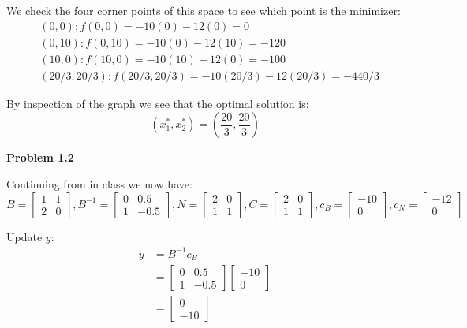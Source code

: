 \documentclass[12pt]{article}
\begin{document}
We check the four corner points of this space to see which point is the minimizer:
\begin{align*}
&(0,0): f(0,0) = -10(0)-12(0) = 0 \\
&(0,10): f(0, 10) = -10(0)-12(10) = -120\\
&(10,0): f(10, 0) = -10(10)-12(0) = -100\\
&(20/3, 20/3): f(20/3, 20/3) = -10(20/3)-12(20/3) = -440/3
\end{align*}

By inspection of the graph we see that the optimal solution is:
$$
(x_1^*, x_2^*) = \left(\frac{20}{3}, \frac{20}{3} \right)
$$

\noindent\textbf{Problem 1.2}

Continuing from in class we now have:
$$
B = \left[\begin{array}{cc} 1 & 1 \\ 2 & 0 \end{array}\right],
B^{-1} = \left[\begin{array}{cc} 0 & 0.5 \\ 1 & -0.5 \end{array}\right],
N = \left[\begin{array}{cc} 2 & 0 \\ 1 & 1 \end{array}\right],
C = \left[\begin{array}{cc} 2 & 0 \\ 1 & 1 \end{array}\right],
c_B = \left[\begin{array}{c} -10 \\ 0 \end{array}\right],
c_N = \left[\begin{array}{c} -12 \\ 0 \end{array}\right]
$$

Update $y$:
\begin{align*}
y &= B^{-1}c_B \\
&= \left[\begin{array}{cc} 0 & 0.5 \\ 1 & -0.5 \end{array}\right]\left[\begin{array}{c} -10 \\ 0 \end{array}\right] \\
&= \left[\begin{array}{c} 0 \\ -10 \end{array}\right]
\end{align*}
\end{document}
